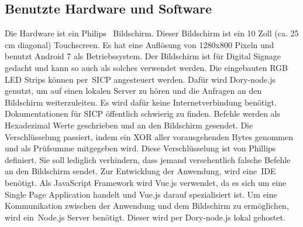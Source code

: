 \subsection{Benutzte Hardware und Software}\label{subsec:benutzte-hardware-und-software}
\newline
Die Hardware ist ein Philips~\cite{10BDL4551T/00} Bildschirm.
Dieser Bildschirm ist ein 10 Zoll (ca. 25 cm diagonal) Touchscreen.
Es hat eine Auflösung von 1280x800 Pixeln und benutzt Android 7 als Betriebssystem.
Der Bildschirm ist für Digital Signage gedacht und kann so auch als solches verwendet werden.
Die eingebauten RGB LED Strips können per~\gls{SICP} angesteuert werden.
Dafür wird Dory-node.js genutzt, um auf einen lokalen Server zu hören und die Anfragen an den Bildschirm weiterzuleiten.
Es wird dafür keine Internetverbindung benötigt.
Dokumentationen für SICP öffentlich schwierig zu finden.
Befehle werden als Hexadezimal Werte geschrieben und an den Bildschirm gesendet.
Die Verschlüsselung passiert, indem ein XOR aller vorausgehenden Bytes genommen und als Prüfsumme mitgegeben wird.
Diese Verschlüsselung ist von Phillips definiert.
Sie soll lediglich verhindern, dass jemand versehentlich falsche Befehle an den Bildschirm sendet.
\newline
\newline
{}
Zur Entwicklung der Anwendung, wird eine~\gls{IDE} benötigt.
Als JavaScript Framework wird Vue.js verwendet, da es sich um eine Single Page Application handelt und Vue.js darauf spezialisiert ist.
\newline
{}
Um eine Kommunikation zwischen der Anwendung und dem Bildschirm zu ermöglichen, wird ein~\gls{Node.js Server} benötigt.
Dieser wird per Dory-node.js lokal gehostet.
